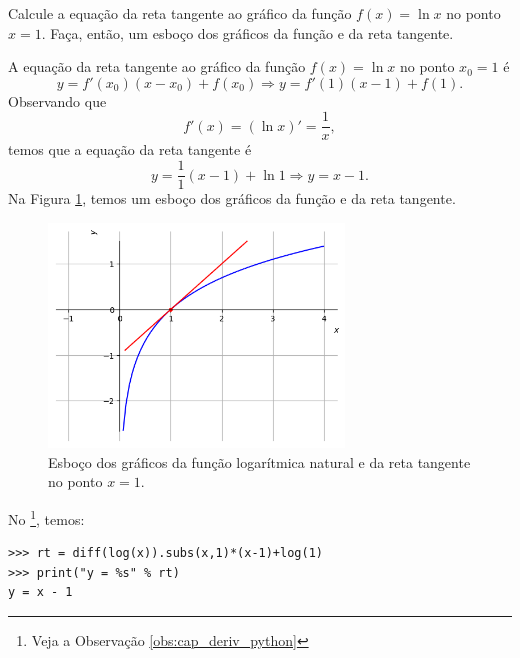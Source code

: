\begin{exeresol}
  Calcule a equação da reta tangente ao gráfico da função $f(x) = \ln x$ no ponto $x=1$. Faça, então, um esboço dos gráficos da função e da reta tangente.
\end{exeresol}
\begin{resol}
  A equação da reta tangente ao gráfico da função $f(x) = \ln x$ no ponto $x_0=1$ é
  \begin{equation}
    y = f'(x_0)(x-x_0)+f(x_0) \Rightarrow y = f'(1)(x-1)+f(1).
  \end{equation}
  Observando que
  \begin{equation}
    f'(x) = (\ln x)' = \frac{1}{x},
  \end{equation}
  temos que a equação da reta tangente é
  \begin{equation}
    y = \frac{1}{1}(x-1)+\ln 1 \Rightarrow y = x-1.
  \end{equation}
  Na Figura \ref{fig:deriv_exeresol_rt_ln}, temos um esboço dos gráficos da função e da reta tangente.

  \begin{figure}[H]
    \centering
    \includegraphics[width=0.7\textwidth]{./cap_deriv/dados/fig_deriv_exeresol_rt_ln/fig_deriv_exeresol_rt_ln}
    \caption{Esboço dos gráficos da função logarítmica natural e da reta tangente no ponto $x=1$.}
    \label{fig:deriv_exeresol_rt_ln}
  \end{figure}

  \ifispython
  No \sympy\footnote{Veja a Observação \ref{obs:cap_deriv_python}}, temos:
\begin{verbatim}
>>> rt = diff(log(x)).subs(x,1)*(x-1)+log(1)
>>> print("y = %s" % rt)
y = x - 1
\end{verbatim}
  \fi    
\end{resol}

